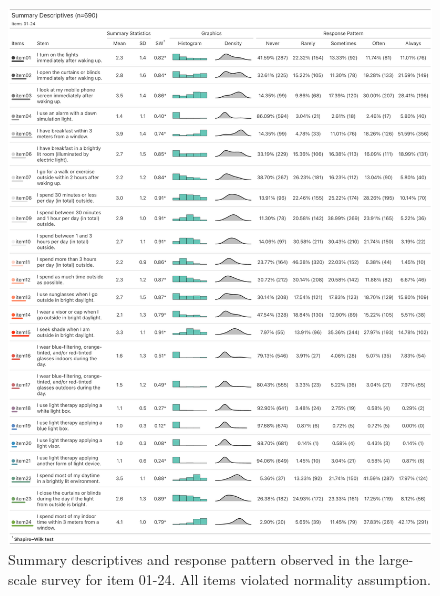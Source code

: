 \documentclass[
  man]{apa6}
\begin{document}
\begin{figure}
\includegraphics[width=2.5\linewidth,height=1\textheight]{Figures/Figure2} \caption{Summary descriptives and response pattern observed in the large-scale survey for item 01-24. All items violated normality assumption.}\label{fig:efagtPic1}
\end{figure}
\end{document}
